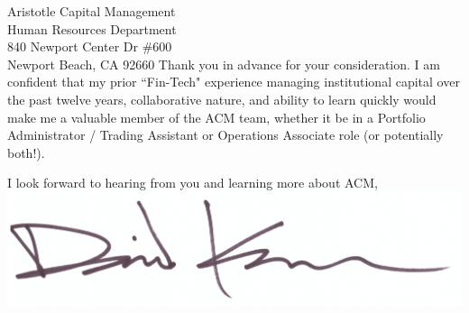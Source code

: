 \documentclass[10pt]{letter}
\begin{document}
\begin{letter}{
  Aristotle Capital Management \\
  Human Resources Department \\
  840 Newport Center Dr \#600 \\
  Newport Beach, CA 92660
}
Thank you in advance for your consideration. I am confident that my prior ``Fin-Tech"
experience managing institutional capital over the past twelve years, collaborative nature,
and ability to learn quickly would make me a valuable member of the ACM team,
whether it be in a Portfolio Administrator / Trading Assistant or Operations
Associate role (or potentially both!). \\

\closing{
  I look forward to hearing from you and learning more about ACM, \\
  \vspace{.5in}
  \includegraphics[scale=0.4]{signature.png}
}

\end{letter}
\end{document}
